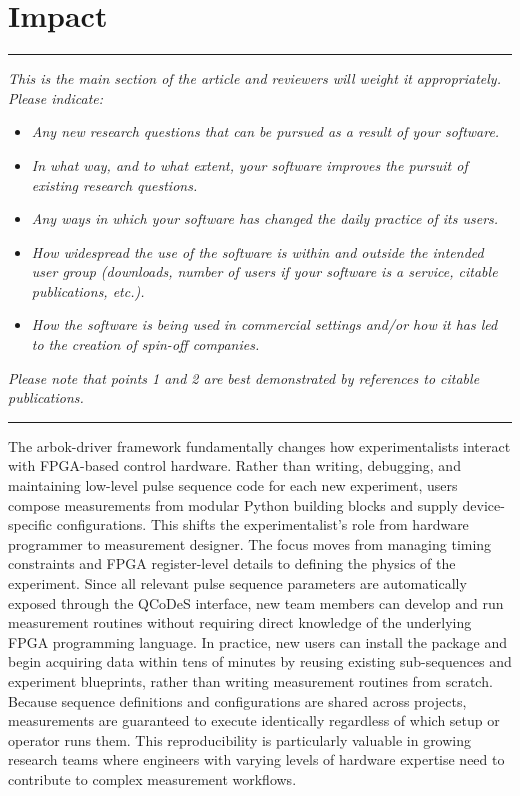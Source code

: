 \documentclass[numbers, preprint, twocolumn,10pt]{elsarticle}
\newenvironment{instructions}
  {\hrule\vspace{4pt}\begingroup\color{red}\itshape}
  {\endgroup\hrule\vspace{4pt}}
\begin{document}
\section{Impact}
\begin{instructions}
\textit{
    This is the main section of the article and reviewers will weight it appropriately.
    Please indicate:
    }
\begin{itemize}
    \item \textit{Any new research questions that can be pursued as a result of your software.}
    \item \textit{In what way, and to what extent, your software improves the pursuit of existing research questions.}
    \item \textit{Any ways in which your software has changed the daily practice of its users.}
    \item \textit{How widespread the use of the software is within and outside the intended user group (downloads, number of users if your software is a service, citable publications, etc.).}
    \item \textit{How the software is being used in commercial settings and/or how it has led to the creation of spin-off companies.}
    \end{itemize}
\textit{
    Please note that points 1 and 2 are best demonstrated by references to citable publications.
    }
\end{instructions}
\noindent
The arbok-driver framework fundamentally changes how experimentalists interact with FPGA-based control hardware. Rather than writing, debugging, and maintaining low-level pulse sequence code for each new experiment, users compose measurements from modular Python building blocks and supply device-specific configurations. This shifts the experimentalist's role from hardware programmer to measurement designer. The focus moves from managing timing constraints and FPGA register-level details to defining the physics of the experiment. Since all relevant pulse sequence parameters are automatically exposed through the QCoDeS interface, new team members can develop and run measurement routines without requiring direct knowledge of the underlying FPGA programming language. In practice, new users can install the package and begin acquiring data within tens of minutes by reusing existing sub-sequences and experiment blueprints, rather than writing measurement routines from scratch. Because sequence definitions and configurations are shared across projects, measurements are guaranteed to execute identically regardless of which setup or operator runs them. This reproducibility is particularly valuable in growing research teams where engineers with varying levels of hardware expertise need to contribute to complex measurement workflows.
\end{document}
